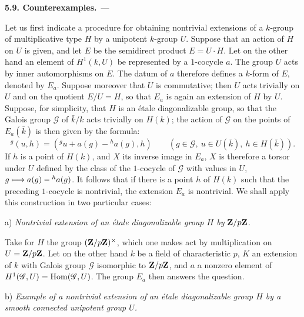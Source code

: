 \par\medskip\noindent\textbf{5.9. Counterexamples.}\ ---\par\label{XVII.5.9}
Let us first indicate a procedure for obtaining nontrivial extensions of a $k$-group of multiplicative type $H$ by a unipotent $k$-group $U$. Suppose that an action of $H$ on $U$ is given, and let $E$ be the semidirect product $E=U\cdot H$. Let on the other hand an element of $H^1(k,U)$ be represented by a $1$-cocycle $a$.
The group $U$ acts by inner automorphisms on $E$. The datum of $a$ therefore defines a $k$-form of $E$, denoted by $E_a$. Suppose moreover that $U$ is commutative; then $U$ acts trivially on $U$ and on the quotient $E/U=H$, so that $E_a$ is again an extension of $H$ by $U$. Suppose, for simplicity, that $H$ is an étale diagonalizable group, so that the Galois group $\mathscr G$ of $\bar k/k$ acts trivially on $H(k)$; the action of $\mathscr G$ on the points of $E_a(\bar k)$ is then given by the formula:
\[
 {}^g(u,h)=({}^gu+a(g)-{}^ha(g),h)
 \qquad(g\in\mathscr G,\ u\in U(\bar k),\ h\in H(\bar k)).
\]
If $h$ is a point of $H(k)$, and $X$ its inverse image in $E_a$, $X$ is therefore a torsor under $U$ defined by the class of the $1$-cocycle of $\mathscr G$ with values in $U$, $g\longmapsto a(g)-{}^ha(g)$. It follows that if there is a point $h$ of $H(k)$ such that the preceding $1$-cocycle is nontrivial, the extension $E_a$ is nontrivial. We shall apply this construction in two particular cases:

\noindent a) \emph{Nontrivial extension of an étale diagonalizable group $H$ by $\mathbf{Z}/p\mathbf{Z}$.}

Take for $H$ the group $(\mathbf{Z}/p\mathbf{Z})^\times$, which one makes act by multiplication on $U=\mathbf{Z}/p\mathbf{Z}$. Let on the other hand $k$ be a field of characteristic $p$, $K$ an extension of $k$ with Galois group $\mathscr G$ isomorphic to $\mathbf{Z}/p\mathbf{Z}$, and $a$ a nonzero element of $H^1(\mathscr G,U)=\operatorname{Hom}(\mathscr G,U)$. The group $E_a$ then answers the question.

\noindent b) \emph{Example of a nontrivial extension of an étale diagonalizable group $H$ by a smooth connected unipotent group $U$.}\par\nopagebreak[4]

